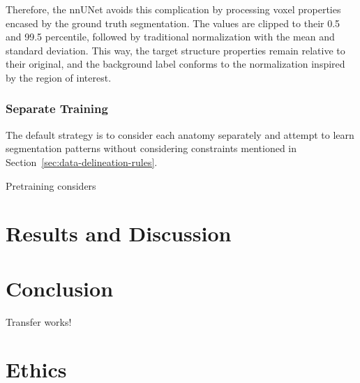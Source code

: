 \documentclass[12pt,twoside]{report}
\begin{document}
Therefore, the nnUNet avoids this complication by processing voxel properties encased by the ground truth segmentation. The values are clipped to their 0.5 and 99.5 percentile, followed by traditional normalization with the mean and standard deviation. This way, the target structure properties remain relative to their original, and the background label conforms to the normalization inspired by the region of interest.

\subsection{Separate Training}

The default strategy is to consider each anatomy separately and attempt to learn segmentation patterns without considering constraints mentioned in Section~\ref{sec:data-delineation-rules}. 

Pretraining considers 





\chapter{Results and Discussion}\label{sect:results}\label{sect:discussion}




\chapter{Conclusion}

Transfer works!


\chapter{Ethics}
\end{document}
